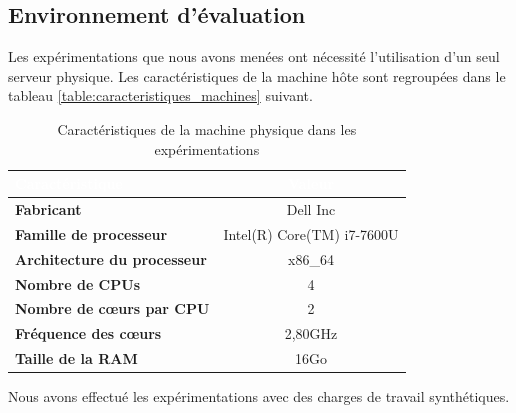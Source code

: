 \subsection{Environnement d'évaluation}
Les expérimentations que nous avons menées ont nécessité l'utilisation d'un seul serveur physique. Les caractéristiques de la machine hôte sont regroupées dans le tableau \ref{table:caracteristiques_machines} suivant.
\begin{table}[H]
  \begin{center}
    \caption{Caractéristiques de la machine physique dans les expérimentations}
    \begin{tabular}{|>{\bfseries}l|c|}
      \hline
      \cellcolor[RGB]{165,42,42}\textcolor{white}{\textbf{Caractéristique}} & \cellcolor[RGB]{165,42,42}\textcolor{white}{\textbf{Valeur}}\\
      \hline
      \hline
      Fabricant & Dell Inc \\ \hline
      Famille de processeur & Intel(R) Core(TM) i7-7600U \\ \hline
      Architecture du processeur & x86\_64 \\ \hline
      Nombre de CPUs & 4 \\ \hline
      Nombre de cœurs par CPU & 2 \\ \hline
      Fréquence des cœurs & 2,80GHz \\ \hline
      Taille de la RAM & 16Go \\ \hline
    \end{tabular}
    \label{tab:caracteristiques_machines}
  \end{center}
\end{table}

\noindent Nous avons effectué les expérimentations avec des charges de travail synthétiques. 

